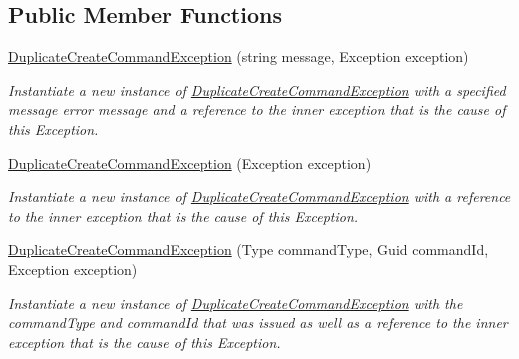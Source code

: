 \subsection*{Public Member Functions}
\begin{DoxyCompactItemize}
\item 
\hyperlink{classCqrs_1_1Domain_1_1Exceptions_1_1DuplicateCreateCommandException_a0e8200ecbb5356dcb91eff89c7376784_a0e8200ecbb5356dcb91eff89c7376784}{Duplicate\+Create\+Command\+Exception} (string message, Exception exception)
\begin{DoxyCompactList}\small\item\em Instantiate a new instance of \hyperlink{classCqrs_1_1Domain_1_1Exceptions_1_1DuplicateCreateCommandException}{Duplicate\+Create\+Command\+Exception} with a specified {\itshape message} error message and a reference to the inner {\itshape exception}  that is the cause of this Exception. \end{DoxyCompactList}\item 
\hyperlink{classCqrs_1_1Domain_1_1Exceptions_1_1DuplicateCreateCommandException_af7b3528197bfb3e1b1b67ac286268913_af7b3528197bfb3e1b1b67ac286268913}{Duplicate\+Create\+Command\+Exception} (Exception exception)
\begin{DoxyCompactList}\small\item\em Instantiate a new instance of \hyperlink{classCqrs_1_1Domain_1_1Exceptions_1_1DuplicateCreateCommandException}{Duplicate\+Create\+Command\+Exception} with a reference to the inner {\itshape exception}  that is the cause of this Exception. \end{DoxyCompactList}\item 
\hyperlink{classCqrs_1_1Domain_1_1Exceptions_1_1DuplicateCreateCommandException_a1781a01346ef9ed2619e8edacff00ba9_a1781a01346ef9ed2619e8edacff00ba9}{Duplicate\+Create\+Command\+Exception} (Type command\+Type, Guid command\+Id, Exception exception)
\begin{DoxyCompactList}\small\item\em Instantiate a new instance of \hyperlink{classCqrs_1_1Domain_1_1Exceptions_1_1DuplicateCreateCommandException}{Duplicate\+Create\+Command\+Exception} with the {\itshape command\+Type}  and {\itshape command\+Id}  that was issued as well as a reference to the inner {\itshape exception}  that is the cause of this Exception. \end{DoxyCompactList}\end{DoxyCompactItemize}
